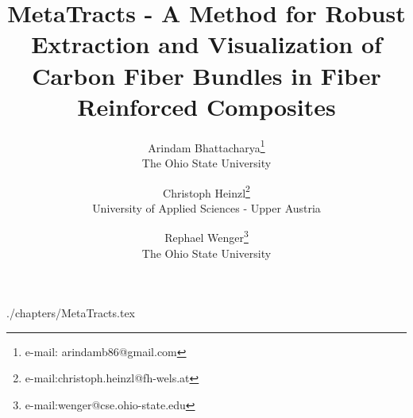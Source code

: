 \documentclass[review]{vgtc}                 %
\title{MetaTracts - A Method for Robust Extraction and Visualization of Carbon Fiber Bundles in Fiber Reinforced Composites}
\author{Arindam Bhattacharya\thanks{e-mail: arindamb86@gmail.com}\\ %
        \scriptsize The Ohio State University %
\and Christoph Heinzl\thanks{e-mail:christoph.heinzl@fh-wels.at}\\ %
     \scriptsize University of Applied Sciences - Upper Austria%
\and Rephael Wenger\thanks{e-mail:wenger@cse.ohio-state.edu}\\ %
    \scriptsize The Ohio State University}
\begin{document}


\maketitle

 {./chapters/MetaTracts.tex}





\end{document}
